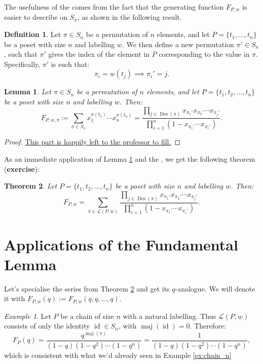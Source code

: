 \documentclass[11pt]{amsart}
\theoremstyle{plain}
\newtheorem{theorem}{Theorem}[section]
\newtheorem{lemma}[theorem]{Lemma}
\theoremstyle{definition}
\newtheorem{definition}{Definition}
\theoremstyle{remark}
\newtheorem{example}{Example}[section]
\newcommand{\LL}{\mathcal{L}}
\DeclareMathOperator{\id}{id}
\DeclareMathOperator{\Des}{Des}
\DeclareMathOperator{\maj}{maj}
\numberwithin{equation}{section}
\begin{document}
The usefulness of the  comes from the fact that the generating function $F_{P, w}$ is easier to describe on $S_\pi$, as shown in the following result.

\begin{definition}
	Let $\pi \in S_n$ be a permutation of $n$ elements, and let $P = \{t_1, \ldots, t_n\}$ be a poset with size $n$ and labelling $w$. We then define a new
	permutation $\pi' \in S_n$, such that $\pi'$ gives the index of the element in $P$ corresponding to the value in $\pi$. Specifically, $\pi'$ is such that:
	\[
		\pi_i = w(t_j) \implies \pi_i' = j.
	\]
\end{definition}

\begin{lemma}
	Let $\pi \in S_n$ be a permutation of $n$ elements, and let $P = \{t_1, t_2, \ldots, t_n\}$ be a poset with size $n$ and labelling $w$. Then:
	\[
		F_{P, w, \pi} \coloneq \sum_{\sigma \in S_\pi} x_1^{\sigma(t_1)} \cdots x_n^{\sigma(t_n)} = \frac{\prod_{j \in \Des(\pi)} x_{\pi_1'} x_{\pi_2'} \cdots x_{\pi_j'}}{\prod_{i=1}^n (1 - x_{\pi_1'} \cdots x_{\pi_i'})}.
	\] \label{lem:F_pi}
\end{lemma}

\begin{proof}
	\underline{This part is happily left to the professor to fill.}
\end{proof}

As an immediate application of Lemma \ref{lem:F_pi} and the , we get the following theorem (\textbf{exercise}):

\begin{theorem}
	Let $P = \{t_1, t_2, \ldots, t_n\}$ be a poset with size $n$ and labelling $w$. Then:
	\[
		F_{P, w} = \sum_{\pi \in \LL(P, w)} \frac{\prod_{j \in \Des(\pi)} x_{\pi_1'} x_{\pi_2'} \cdots x_{\pi_j'}}{\prod_{i=1}^n (1 - x_{\pi_1'} \cdots x_{\pi_i'})}.
	\] \label{thm:F_pw}
\end{theorem}

\section{Applications of the Fundamental Lemma}

Let's specialise the series from Theorem \ref{thm:F_pw} and get its $q$-analogue. We will denote
it with $F_{P, w}(q) := F_{P, w}(q, q, \ldots, q)$.

\begin{example}
	Let $P$ be a chain of size $n$ with a natural labelling. Thus $\LL(P, w)$ consists of only the identity $\id \in S_n$, with $\maj(\id) = 0$.
	Therefore: \label{ex:Fq_chain}
	\[
		F_P(q) = \frac{q^{\maj(\pi)}}{(1-q)(1-q^2) \cdots (1-q^n)} = \frac{1}{(1-q)(1-q^2) \cdots (1-q^n)},
	\]
	which is consistent with what we'd already seen in Example \ref{ex:chain_n}
\end{example}
\end{document}
